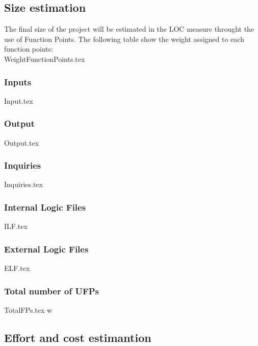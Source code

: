 \subsection{Size estimation}
The final size of the project will be estimated in the  LOC measure throught the use of Function Points.
The following table show the weight assigned to each function points:\\

{WeightFunctionPoints.tex}

\subsubsection{Inputs}

{Input.tex}

\subsubsection{Output}
{Output.tex}

\subsubsection{Inquiries}
{Inquiries.tex}

\subsubsection{Internal Logic Files}
{ILF.tex}

\subsubsection{External Logic Files}
{ELF.tex}

\subsubsection{Total number of UFPs}
{TotalFPs.tex}
w
\subsection{Effort and cost estimantion}
